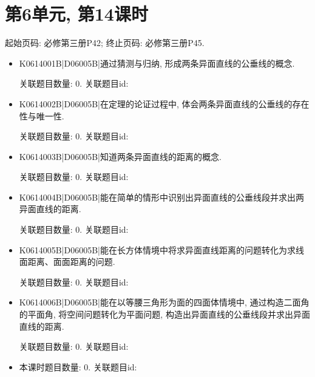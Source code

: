 \section*{第6单元, 第14课时}
起始页码: 必修第三册P42; 终止页码: 必修第三册P45.
\begin{itemize}
\item K0614001B|D06005B|通过猜测与归纳, 形成两条异面直线的公垂线的概念.

关联题目数量: 0. 关联题目id: 

\item K0614002B|D06005B|在定理的论证过程中, 体会两条异面直线的公垂线的存在性与唯一性.

关联题目数量: 0. 关联题目id: 

\item K0614003B|D06005B|知道两条异面直线的距离的概念.

关联题目数量: 0. 关联题目id: 

\item K0614004B|D06005B|能在简单的情形中识别出异面直线的公垂线段并求出两异面直线的距离.

关联题目数量: 0. 关联题目id: 

\item K0614005B|D06005B|能在长方体情境中将求异面直线距离的问题转化为求线面距离、面面距离的问题.

关联题目数量: 0. 关联题目id: 

\item K0614006B|D06005B|能在以等腰三角形为面的四面体情境中, 通过构造二面角的平面角, 将空间问题转化为平面问题, 构造出异面直线的公垂线段并求出异面直线的距离.

关联题目数量: 0. 关联题目id: 

\item 本课时题目数量: 0. 关联题目id: 

\end{itemize}

